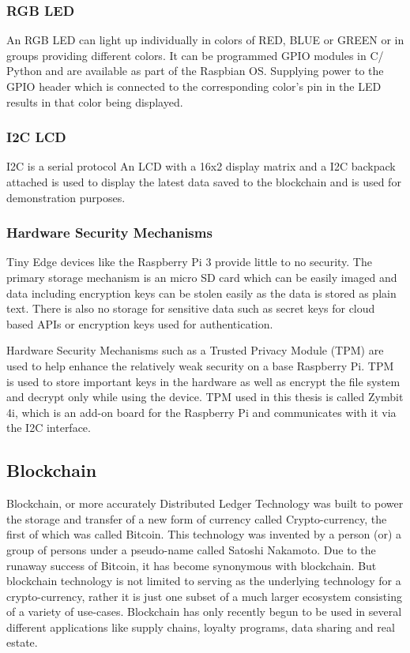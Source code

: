 \documentclass[11pt,openright]{report}
\begin{document}
\subsubsection{RGB LED}
An RGB LED can light up individually in colors of RED, BLUE or GREEN or in groups providing different colors. It can be programmed GPIO modules in C/ Python and are available as part of the Raspbian OS. Supplying power to the GPIO header which is connected to the corresponding color’s pin in the LED results in that color being displayed. 

\subsubsection{I2C LCD}
I2C is a serial protocol 
An LCD with a 16x2 display matrix and a I2C backpack attached is used to display the latest data saved to the blockchain and is used for demonstration purposes. 

\subsubsection{Hardware Security Mechanisms}
Tiny Edge devices like the Raspberry Pi 3 provide little to no security.
The primary storage mechanism is an micro SD card which can be easily imaged and data including encryption keys can be stolen easily as the data is stored as plain text. There is also no storage for sensitive data such as secret keys for cloud based APIs or encryption keys used for authentication.

Hardware Security Mechanisms such as a Trusted Privacy Module (TPM) are used to help enhance the relatively weak security on a base Raspberry Pi. TPM is used to store important keys in the hardware as well as encrypt the file system and decrypt only while using the device. TPM used in this thesis is called Zymbit 4i, which is an add-on board for the Raspberry Pi and communicates with it via the I2C interface.

\subsection{Blockchain}
Blockchain, or more accurately Distributed Ledger Technology was built to power the storage and transfer of a new form of currency called Crypto-currency, the first of which was called Bitcoin. This technology was invented by a person (or) a group of persons under a pseudo-name called Satoshi Nakamoto. Due to the runaway success of Bitcoin, it has become synonymous with blockchain. But blockchain technology is not limited to serving as the underlying technology for a crypto-currency, rather it is just one subset of a much larger ecosystem consisting of a variety of use-cases. Blockchain has only recently begun to be used in several different applications like supply chains, loyalty programs, data sharing and real estate.
\end{document}
